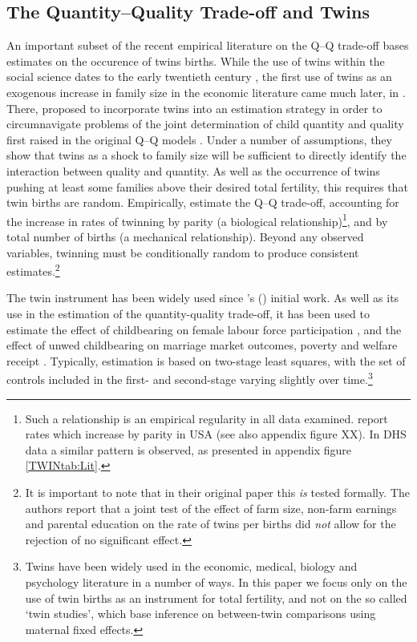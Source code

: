 \documentclass[subeqn]{article}
\begin{document}
\begin{spacing}{1.4}
\subsection{The Quantity--Quality Trade-off and Twins}
An important subset of the recent empirical literature on the Q--Q trade-off
bases estimates on the occurence of twins births.  While the use of twins within
the social science dates to the early twentieth century \citep{Thorndike1905}, the
first use of twins as an exogenous increase in family size in the economic
literature came much later, in \citet{RosenzweigWolpin1980}. There,
\citet{RosenzweigWolpin1980} proposed to incorporate twins into an estimation
strategy in order to circumnavigate problems of the joint determination of child 
quantity and quality first raised in the original Q--Q models \citep{BeckerLewis1973,
Willis1973,DeTray1973,BeckerTomes1976}.  Under a number of assumptions, they show 
that twins as a shock to family size will be sufficient to directly identify the 
interaction between quality and quantity.  As well as the occurrence of twins 
pushing at least some families above their desired total fertility, this requires 
that twin births are random.  Empirically, \citet{RosenzweigWolpin1980} 
estimate the Q--Q trade-off, accounting for the increase in rates of twinning by 
parity (a biological relationship)\footnote{Such a relationship is an empirical 
regularity in all data examined. \citet{RosenzweigWolpin1980} report rates which 
increase by parity in USA (see also appendix figure XX).  In DHS data a similar
pattern is observed, as presented in appendix figure \ref{TWINtab:Lit}.}, and by
total number of births (a mechanical relationship).  Beyond any observed variables,
twinning must be conditionally random to produce consistent estimates.\footnote{It
  is important to note that in their original paper this \emph{is} tested formally.
  The authors report that a joint test of the effect of farm size, non-farm earnings
  and parental education on the rate of twins per births did \emph{not} allow for
  the rejection of no significant effect.}

The twin instrument has been widely used since \citeauthor{RosenzweigWolpin1980}'s
(\citeyear{RosenzweigWolpin1980}) initial work. As well as its use in the 
estimation of the quantity-quality trade-off, it has been used to estimate the
effect of childbearing on female labour force participation
\citep{RosenzweigWolpin1980b,Jacobsenetal1999,AngristEvans1998}, and the effect 
of unwed childbearing on marriage market outcomes, poverty and welfare receipt 
\citep{BronarsGrogger1994}.  Typically, estimation is based on two-stage least
squares, with the set of controls included in the first- and second-stage 
varying slightly over time.\footnote{Twins have been widely used in the economic, 
medical, biology and psychology literature in a number of ways.  In this paper 
we focus only on the use of twin births as an instrument for total fertility, 
and not on the so called `twin studies', which base inference on between-twin 
comparisons using maternal fixed effects.}


\end{spacing}
\end{document}
